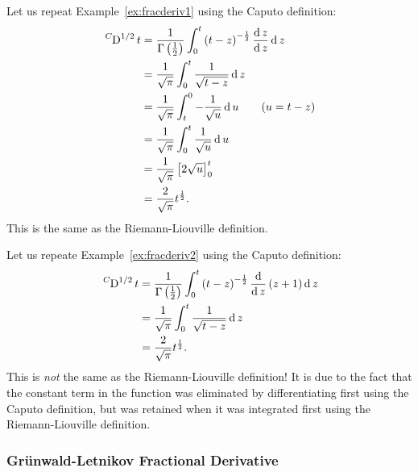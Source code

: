\begin{example}
Let us repeat Example~\ref{ex:fracderiv1} using the Caputo definition:
\begin{align*}
\tensor*[^C]{\D}{^{1/2}} t &= \frac{1}{\Gamma \left( \frac{1}{2} \right) } \int_0^t \left( t - z \right)^{-\frac{1}{2}}
\frac{\d z}{\d z} \d z \\
&= \frac{1}{\sqrt{\pi}} \int_0^t \frac{1}{\sqrt{t - z}} \d z \\
&= \frac{1}{\sqrt{\pi}} \int_t^0 -\frac{1}{\sqrt{u}} \d u \qquad (u = t - z) \\
&= \frac{1}{\sqrt{\pi}} \int_0^t \frac{1}{\sqrt{u}} \d u \\
&= \frac{1}{\sqrt{\pi}} \left[ 2 \sqrt{u} \right]_0^t \\
&= \frac{2}{\sqrt{\pi}} t^\frac{1}{2}.
\end{align*}
This is the same as the Riemann-Liouville definition. 
\label{ex:caputo1}
\end{example}

\begin{example}
Let us repeate Example~\ref{ex:fracderiv2} using the Caputo definition:
\begin{align*}
\tensor*[^C]{\D}{^{1/2}} t &= \frac{1}{\Gamma \left( \frac{1}{2} \right) } \int_0^t \left( t - z \right)^{-\frac{1}{2}}
\frac{\d }{\d z} \left( z + 1 \right) \d z \\
&= \frac{1}{\sqrt{\pi}} \int_0^t \frac{1}{\sqrt{t - z}} \d z \\
&= \frac{2}{\sqrt{\pi}} t^\frac{1}{2}.
\end{align*}
This is \emph{not} the same as the Riemann-Liouville definition! It is due to the fact that the constant term in the
function was eliminated by differentiating first using the Caputo definition, but was retained when it was integrated
first using the Riemann-Liouville definition. 
\end{example}
\subsubsection{Gr\"unwald-Letnikov Fractional Derivative}
